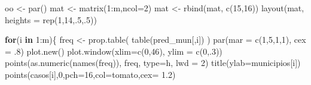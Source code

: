 \documentclass[
  letterpaper,
  DIV=11,
  numbers=noendperiod]{scrreprt}
\newenvironment{Shaded}{\begin{snugshade}}{\end{snugshade}}
\newcommand{\AttributeTok}[1]{\textcolor[rgb]{0.40,0.45,0.13}{#1}}
\newcommand{\ControlFlowTok}[1]{\textcolor[rgb]{0.00,0.23,0.31}{\textbf{#1}}}
\newcommand{\DecValTok}[1]{\textcolor[rgb]{0.68,0.00,0.00}{#1}}
\newcommand{\FloatTok}[1]{\textcolor[rgb]{0.68,0.00,0.00}{#1}}
\newcommand{\FunctionTok}[1]{\textcolor[rgb]{0.28,0.35,0.67}{#1}}
\newcommand{\NormalTok}[1]{\textcolor[rgb]{0.00,0.23,0.31}{#1}}
\newcommand{\OtherTok}[1]{\textcolor[rgb]{0.00,0.23,0.31}{#1}}
\newcommand{\SpecialCharTok}[1]{\textcolor[rgb]{0.37,0.37,0.37}{#1}}
\newcommand{\StringTok}[1]{\textcolor[rgb]{0.13,0.47,0.30}{#1}}
\theoremstyle{plain}
\theoremstyle{definition}
\theoremstyle{definition}
\theoremstyle{remark}
\begin{document}
\begin{Shaded}
\begin{Highlighting}[]
\NormalTok{oo }\OtherTok{\textless{}{-}} \FunctionTok{par}\NormalTok{()}
\NormalTok{mat }\OtherTok{\textless{}{-}} \FunctionTok{matrix}\NormalTok{(}\DecValTok{1}\SpecialCharTok{:}\NormalTok{m,}\AttributeTok{ncol=}\DecValTok{2}\NormalTok{)}
\NormalTok{mat }\OtherTok{\textless{}{-}} \FunctionTok{rbind}\NormalTok{(mat, }\FunctionTok{c}\NormalTok{(}\DecValTok{15}\NormalTok{,}\DecValTok{16}\NormalTok{))}
\FunctionTok{layout}\NormalTok{(mat, }\AttributeTok{heights =} \FunctionTok{rep}\NormalTok{(}\DecValTok{1}\NormalTok{,}\DecValTok{14}\NormalTok{,.}\DecValTok{5}\NormalTok{,.}\DecValTok{5}\NormalTok{))}

\ControlFlowTok{for}\NormalTok{(i }\ControlFlowTok{in} \DecValTok{1}\SpecialCharTok{:}\NormalTok{m)\{}
\NormalTok{  freq }\OtherTok{\textless{}{-}} \FunctionTok{prop.table}\NormalTok{( }\FunctionTok{table}\NormalTok{(pred\_mun[,i]) )}
  \FunctionTok{par}\NormalTok{(}\AttributeTok{mar =} \FunctionTok{c}\NormalTok{(}\DecValTok{1}\NormalTok{,}\DecValTok{5}\NormalTok{,}\DecValTok{1}\NormalTok{,}\DecValTok{1}\NormalTok{), }\AttributeTok{cex =}\NormalTok{ .}\DecValTok{8}\NormalTok{)}
  \FunctionTok{plot.new}\NormalTok{()}
  \FunctionTok{plot.window}\NormalTok{(}\AttributeTok{xlim=}\FunctionTok{c}\NormalTok{(}\DecValTok{0}\NormalTok{,}\DecValTok{46}\NormalTok{), }\AttributeTok{ylim =} \FunctionTok{c}\NormalTok{(}\DecValTok{0}\NormalTok{,.}\DecValTok{3}\NormalTok{))}
  \FunctionTok{points}\NormalTok{(}\FunctionTok{as.numeric}\NormalTok{(}\FunctionTok{names}\NormalTok{(freq)), freq, }\AttributeTok{type=}\StringTok{\textquotesingle{}h\textquotesingle{}}\NormalTok{, }\AttributeTok{lwd =} \DecValTok{2}\NormalTok{)}
  \FunctionTok{title}\NormalTok{(}\AttributeTok{ylab=}\NormalTok{municipios[i])}
  \FunctionTok{points}\NormalTok{(casos[i],}\DecValTok{0}\NormalTok{,}\AttributeTok{pch=}\DecValTok{16}\NormalTok{,}\AttributeTok{col=}\StringTok{\textquotesingle{}tomato\textquotesingle{}}\NormalTok{,}\AttributeTok{cex=} \FloatTok{1.2}\NormalTok{)}
  

\end{Highlighting}
\end{Shaded}
\end{document}

